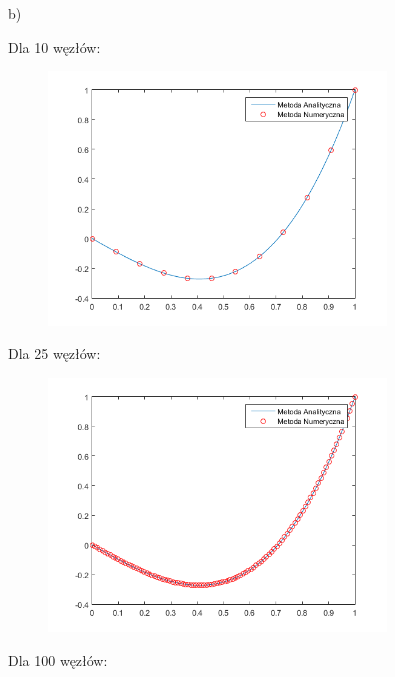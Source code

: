 \newpage

b)

Dla 10 węzłów:

\begin{figure}[!ht]
	\begin{center}
		\includegraphics[width=0.8\textwidth]{Lab3/charts/zad2/10.png}
	\end{center}
\end{figure}

Dla 25 węzłów:

\begin{figure}[!ht]
	\begin{center}
		\includegraphics[width=0.8\textwidth]{Lab3/charts/zad2/25.png}
	\end{center}
\end{figure}

\newpage

Dla 100 węzłów:

